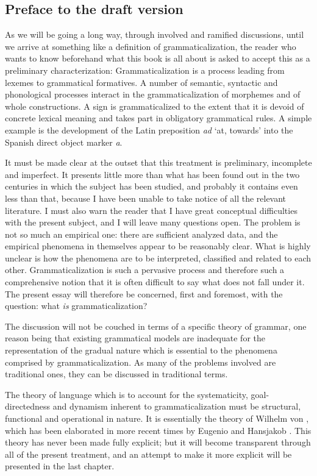 \begin{refsection}

\section*{Preface to the draft version}

As we will be going a long way, through involved and ramified discussions, until we arrive at something like a definition of grammaticalization, the reader who wants to know beforehand what this book is all about is asked to accept this as a preliminary characterization: Grammaticalization is a process leading from lexemes to grammatical formatives. A number of semantic, syntactic and phonological processes interact in the grammaticalization of morphemes and of whole constructions. A sign is grammaticalized to the extent that it is devoid of concrete lexical meaning and takes part in obligatory grammatical rules. A simple example is the development of the Latin preposition \textit{ad} ‘at, towards’ into the Spanish direct object marker \textit{a}.

It must be made clear at the outset that this treatment is preliminary, incomplete and imperfect. It presents little more than what has been found out in the two centuries in which the subject has been studied, and probably it contains even less than that, because I have been unable to take notice of all the relevant literature. I must also warn the reader that I have great conceptual difficulties with the present subject, and I will leave many questions open. The problem is not so much an empirical one: there are sufficient analyzed data, and the empirical phenomena in themselves appear to be reasonably clear. What is highly unclear is how the phenomena are to be interpreted, classified and related to each other. Grammaticalization is such a pervasive process and therefore such a comprehensive notion that it is often difficult to say what does not fall under it. The present essay will therefore be concerned, first and foremost, with the question: what \textit{is} grammaticalization?

The discussion will not be couched in terms of a specific theory of grammar, one reason being that existing grammatical models are inadequate for the representation of the gradual nature which is essential to the phenomena comprised by grammaticalization. As many of the problems involved are traditional ones, they can be discussed in traditional terms.

The theory of language which is to account for the systematicity, goal-directedness and dynamism inherent to grammaticalization must be structural, functional and operational in nature. It is essentially the theory of Wilhelm von \citet{Humboldt1836}, which has been elaborated in more recent times by Eugenio \citet{Coseriu1974} and Hansjakob \citet{Seiler1978}. This theory has never been made fully explicit; but it will become transparent through all of the present treatment, and an attempt to make it more explicit will be presented in the last chapter.


\end{refsection}

